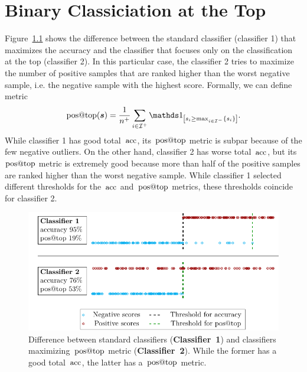 \chapter{Binary Classiciation at the Top}

Figure~\ref{fig: standard vs. aatp} shows the difference between the standard classifier (classifier 1) that maximizes the accuracy and the classifier that focuses only on the classification at the top (classifier 2). In this particular case, the classifier 2 tries to maximize the number of positive samples that are ranked higher than the worst negative sample, i.e. the negative sample with the highest score. Formally, we can define metric
\begin{equation*}
  \postop(\bm{s}) = \frac{1}{n^+} \sum_{i \in \I^+} \Iverson{s_i \ge \max_{i \in \I^-}\{s_i\}}.
\end{equation*}
While classifier 1 has good total~$\operatorname{acc}$, its~$\operatorname{pos@top}$ metric is subpar because of the few negative outliers. On the other hand, classifier 2 has worse total~$\operatorname{acc}$, but its~$\operatorname{pos@top}$ metric is extremely good because more than half of the positive samples are ranked higher than the worst negative sample. While classifier 1 selected different thresholds for the~$\operatorname{acc}$ and~$\operatorname{pos@top}$ metrics, these thresholds coincide for classifier 2.

\begin{figure}
  \centering
  \includegraphics[width = 0.95\linewidth]{images/standard_aatp_comparison.pdf}
  \caption{Difference between standard classifiers (\textbf{Classifier~1}) and classifiers maximizing~$\operatorname{pos@top}$ metric (\textbf{Classifier~2}). While the former has a good total~$\operatorname{acc}$, the latter has a~$\operatorname{pos@top}$ metric.}
  \label{fig: standard vs. aatp}
\end{figure}

